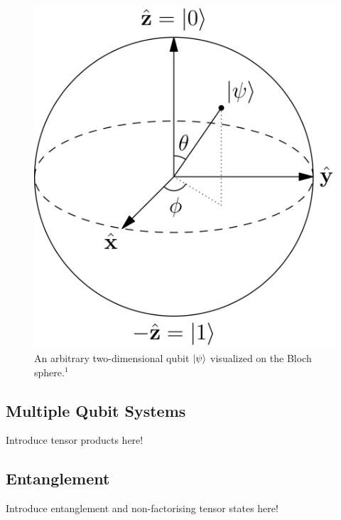 \begin{figure}[!ht]
       \centering
       \includegraphics[scale=0.07]{img/blochsphere.png}
       \caption{\label{fig:blochsphere} An arbitrary two-dimensional qubit $\ket{\psi}$ visualized on the Bloch sphere.$^{1}$}
\end{figure}


\subsection{Multiple Qubit Systems}
\label{subsec:multiplequbitsystems}

Introduce tensor products here!

\subsection{Entanglement}
\label{subsec:entanglement}

Introduce entanglement and non-factorising tensor states here!

